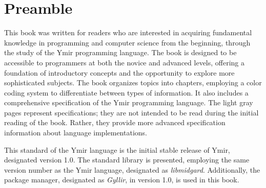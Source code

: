 \chapter*{Preamble}

This book was written for readers who are interested in acquiring fundamental
knowledge in programming and computer science from the beginning, through the
study of the Ymir programming language. The book is designed to be accessible to
programmers at both the novice and advanced levels, offering a foundation of
introductory concepts and the opportunity to explore more sophisticated
subjects. The book organizes topics into chapters, employing a color coding
system to differentiate between types of information. It also includes a
comprehensive specification of the Ymir programming language. The light gray
pages represent specifications; they are not intended to be read during the
initial reading of the book. Rather, they provide more advanced specification
information about language implementations.

This standard of the Ymir language is the initial stable release of Ymir,
designated version 1.0. The standard library is presented, employing the same
version number as the Ymir language, designated as \textit{libmidgard}.
Additionally, the package manager, designated as \textit{Gyllir}, in version
1.0, is used in this book.
